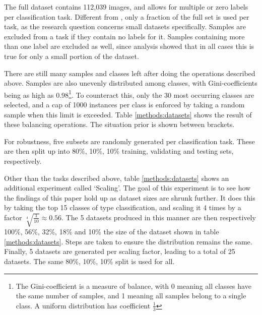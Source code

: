 The full dataset contains 112,039 images, and allows for multiple or zero labels per classification task. Different from \citeauthor{sabatelli2018deep}, only a fraction of the full set is used per task, as the research question concerns small datasets specifically. Samples are excluded from a task if they contain no labels for it. Samples containing more than one label are excluded as well, since analysis showed that in all cases this is true for only a small portion of the dataset.

There are still many samples and classes left after doing the operations described above. Samples are also unevenly distributed among classes, with Gini-coefficients being as high as 0.98\footnote{The Gini-coefficient is a measure of balance, with 0 meaning all classes have the same number of samples, and 1 meaning all samples belong to a single class. A uniform distribution has coefficient $\frac{1}{3}$}. To counteract this, only the 30 most occurring classes are selected, and a cap of 1000 instances per class is enforced by taking a random sample when this limit is exceeded. Table \ref{methods:datasets} shows the result of these balancing operations. The situation prior is shown between brackets.

For robustness, five subsets are randomly generated per classification task. These are then split up into 80\%, 10\%, 10\% training, validating and testing sets, respectively.

Other than the tasks described above, table \ref{methods:datasets} shows an additional experiment called `Scaling'. The goal of this experiment is to see how the findings of this paper hold up as dataset sizes are shrunk further. It does this by taking the top 15 classes of type classification, and scaling it 4 times by a factor $\sqrt[4]{\frac{1}{10}} \approx 0.56$. The 5 datasets produced in this manner are then respectively 100\%, 56\%, 32\%, 18\% and 10\% the size of the dataset shown in table \ref{methods:datasets}. Steps are taken to ensure the distribution remains the same. Finally, 5 datasets are generated per scaling factor, leading to a total of 25 datasets. The same 80\%, 10\%, 10\% split is used for all.


